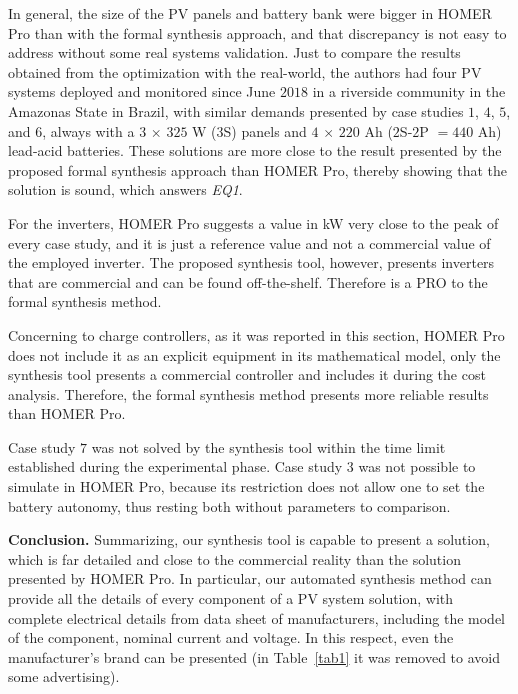\documentclass[runningheads]{llncs}
\begin{document}
In general, the size of the PV panels and battery bank were bigger in HOMER Pro than with the formal synthesis approach, and that discrepancy is not easy to address without some real systems validation. Just to compare the results obtained from the optimization with the real-world, the authors had four PV systems deployed and monitored since June $2018$ in a riverside community in the Amazonas State in Brazil, with similar demands presented by case studies $1$, $4$, $5$, and $6$, always with a $3$ $\times$ $325$ W ($3$S) panels and $4$ $\times$ $220$ Ah ($2$S-$2$P $= 440$ Ah) lead-acid batteries. These solutions are more close to the result presented by the proposed formal synthesis approach than HOMER Pro, thereby showing that the solution is sound, which answers \textit{EQ1}.

For the inverters, HOMER Pro suggests a value in kW very close to the peak of every case study, and it is just a reference value and not a commercial value of the employed inverter. The proposed synthesis tool, however, presents inverters that are commercial and can be found off-the-shelf. Therefore is a PRO to the formal synthesis method.

Concerning to charge controllers, as it was reported in this  section, HOMER Pro does not include it as an explicit equipment in its mathematical model, only the synthesis tool presents a commercial controller and includes it during the cost analysis. Therefore, the formal synthesis method presents more reliable results than HOMER Pro.

Case study $7$ was not solved by the synthesis tool within the time limit established during the experimental phase. Case study $3$ was not possible to simulate in HOMER Pro, because its restriction does not allow one to set the battery autonomy, thus resting both without parameters to comparison.

\textbf{Conclusion.} Summarizing, our synthesis tool is capable to present a solution, which is far detailed and close to the commercial reality than the solution presented by HOMER Pro. In particular, our automated synthesis method can provide all the details of every component of a PV system solution, with complete electrical details from data sheet of manufacturers, including the model of the component, nominal current and voltage. In this respect, even the manufacturer's brand can be presented (in Table~\ref{tab1} it was removed to avoid some advertising).

%
\end{document}

